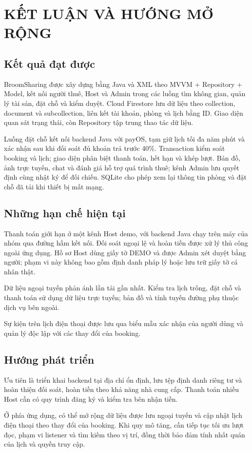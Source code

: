 \chapstart
\section{KẾT LUẬN VÀ HƯỚNG MỞ RỘNG}
\subsection{Kết quả đạt được}
BroomSharing được xây dựng bằng Java và XML theo MVVM + Repository + Model, kết nối người thuê, Host và Admin trong các luồng tìm không gian, quản lý tài sản, đặt chỗ và kiểm duyệt. Cloud Firestore lưu dữ liệu theo collection, document và subcollection, liên kết tài khoản, phòng và lịch bằng ID. Giao diện quan sát trạng thái, còn Repository tập trung thao tác dữ liệu.

Luồng đặt chỗ kết nối backend Java với payOS, tạm giữ lịch tối đa năm phút và xác nhận sau khi đối soát đủ khoản trả trước 40\%. Transaction kiểm soát booking và lịch; giao diện phân biệt thanh toán, hết hạn và khép lượt. Bản đồ, ảnh trực tuyến, chat và đánh giá hỗ trợ quá trình thuê; kênh Admin lưu quyết định cùng nhật ký để đối chiếu. SQLite cho phép xem lại thông tin phòng và đặt chỗ đã tải khi thiết bị mất mạng.

\subsection{Những hạn chế hiện tại}
Thanh toán giới hạn ở một kênh Host demo, với backend Java chạy trên máy của nhóm qua đường hầm kết nối. Đối soát ngoại lệ và hoàn tiền được xử lý thủ công ngoài ứng dụng. Hồ sơ Host dùng giấy tờ DEMO và được Admin xét duyệt bằng người; phạm vi này không bao gồm định danh pháp lý hoặc lưu trữ giấy tờ cá nhân thật.

Dữ liệu ngoại tuyến phản ánh lần tải gần nhất. Kiểm tra lịch trống, đặt chỗ và thanh toán sử dụng dữ liệu trực tuyến; bản đồ và tính tuyến đường phụ thuộc dịch vụ bên ngoài.

Sự kiện trên lịch điện thoại được lưu qua biểu mẫu xác nhận của người dùng và quản lý độc lập với các thay đổi của booking.

\subsection{Hướng phát triển}
Ưu tiên là triển khai backend tại địa chỉ ổn định, lưu tệp định danh riêng tư và hoàn thiện đối soát, hoàn tiền theo khả năng nhà cung cấp. Thanh toán nhiều Host cần có quy trình đăng ký và kiểm tra bên nhận tiền.

Ở phía ứng dụng, có thể mở rộng dữ liệu được lưu ngoại tuyến và cập nhật lịch điện thoại theo thay đổi của booking. Khi quy mô tăng, cần tiếp tục tối ưu lượt đọc, phạm vi listener và tìm kiếm theo vị trí, đồng thời bảo đảm tính nhất quán của lịch và quyền truy cập.
